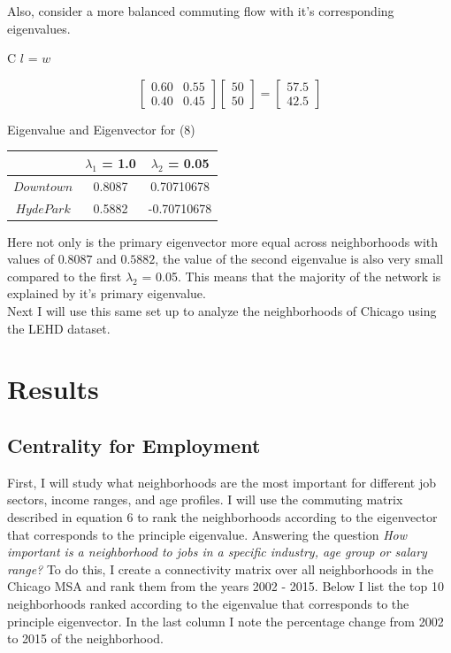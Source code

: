 \documentclass{article}
\theoremstyle{definition}
\theoremstyle{remark}
\begin{document}
Also, consider a more balanced commuting flow with it's corresponding eigenvalues.

\begin{center}C $l$ = $w$\end{center}
\begin{equation} 
  \begin{bmatrix}
    0.60 & 0.55\\
    0.40 & 0.45
  \end{bmatrix}
  \begin{bmatrix}
    50\\
    50
  \end{bmatrix}
  = 
  \begin{bmatrix}
    57.5\\
    42.5
  \end{bmatrix}
\end{equation}

\begin{center} 
Eigenvalue and Eigenvector for (8) \\
\begin{tabular}{||c | c c ||} 
 \hline
 & $\lambda_1$ = 1.0 & $\lambda_2$ = 0.05\\[0.5ex] 
 \hline\hline
 $Downtown$ & 0.8087 & 0.70710678 \\
 $Hyde Park$ & 0.5882 & -0.70710678  \\ 
 \hline
 \end{tabular}
 \end{center}

Here not only is the primary eigenvector more equal across neighborhoods with values of $0.8087$ and $0.5882$, the value of the second eigenvalue is also very small compared to the first $\lambda_2$ = 0.05.  This means that the majority of the network is explained by it's primary eigenvalue. \\
 Next I will use this same set up to analyze the neighborhoods of Chicago using the LEHD dataset.

\section{Results}
\subsection{Centrality for Employment}
First, I will study what neighborhoods are the most important for different job sectors, income ranges, and age profiles.  I will use the commuting matrix described in equation 6 to rank the neighborhoods according to the eigenvector that corresponds to the principle eigenvalue.  Answering the question \textit{How important is a neighborhood to jobs in a specific industry, age group or salary range?}  To do this, I create a connectivity matrix over all neighborhoods in the Chicago MSA and rank them from the years 2002 - 2015.  Below I list the top 10 neighborhoods ranked according to the eigenvalue that corresponds to the principle eigenvector.  In the last column I note the percentage change from 2002 to 2015 of the neighborhood. \\
\end{document}
